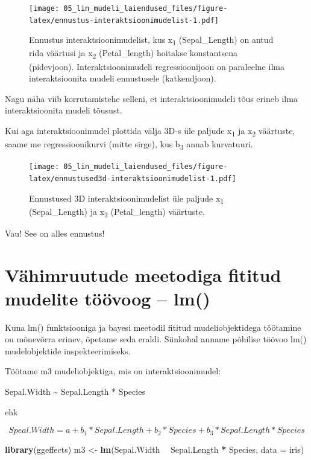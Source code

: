 \documentclass[]{book}
\newenvironment{Shaded}{\begin{snugshade}}{\end{snugshade}}
\newcommand{\KeywordTok}[1]{\textcolor[rgb]{0.13,0.29,0.53}{\textbf{#1}}}
\newcommand{\DataTypeTok}[1]{\textcolor[rgb]{0.13,0.29,0.53}{#1}}
\newcommand{\StringTok}[1]{\textcolor[rgb]{0.31,0.60,0.02}{#1}}
\newcommand{\OperatorTok}[1]{\textcolor[rgb]{0.81,0.36,0.00}{\textbf{#1}}}
\newcommand{\NormalTok}[1]{#1}
\begin{document}
\begin{figure}
\centering
\texttt{[image: 05\_lin\_mudeli\_laiendused\_files/figure-latex/ennustus-interaktsioonimudelist-1.pdf]}
\caption{\label{fig:ennustus-interaktsioonimudelist}Ennustus interaktsioonimudelist,
kus x\textsubscript{1} (Sepal\_Length) on antud rida väärtusi ja
x\textsubscript{2} (Petal\_length) hoitakse konstantsena (pidevjoon).
Interaktsioonimudeli regressioonijoon on paraleelne ilma
interaktsioonita mudeli ennustusele (katkendjoon).}
\end{figure}

Nagu näha viib korrutamistehe selleni, et interaktsioonimudeli tõus
erineb ilma interaktsioonita mudeli tõusust.

Kui aga interaktsioonimudel plottida välja 3D-s üle paljude
x\textsubscript{1} ja x\textsubscript{2} väärtuste, saame me
regressioonikurvi (mitte sirge), kus b\textsubscript{3} annab
kurvatuuri.





\begin{figure}
\centering
\texttt{[image: 05\_lin\_mudeli\_laiendused\_files/figure-latex/ennustused3d-interaktsioonimudelist-1.pdf]}
\caption{\label{fig:ennustused3d-interaktsioonimudelist}Ennustused 3D
interaktsioonimudelist üle paljude x\textsubscript{1} (Sepal\_Length) ja
x\textsubscript{2} (Petal\_length) väärtuste.}
\end{figure}

Vau! See on alles ennustus!

\chapter{Vähimruutude meetodiga fititud mudelite töövoog --
lm()}\label{vahimruutude-meetodiga-fititud-mudelite-toovoog-lm}

Kuna lm() funktsiooniga ja bayesi meetodil fititud mudeliobjektidega
töötamine on mõnevõrra erinev, õpetame seda eraldi. Siinkohal anname
põhilise töövoo lm() mudelobjektide inspekteerimiseks.

Töötame m3 mudeliobjektiga, mis on interaktsioonimudel:

Sepal.Width \textasciitilde{} Sepal.Length * Species

ehk

\[Speal.Width = a + b_1*Sepal.Length + b_2*Species + b_3*Sepal.Length*Species\]

\begin{Shaded}
\begin{Highlighting}[]
\KeywordTok{library}\NormalTok{(ggeffects)}
\NormalTok{m3 <-}\StringTok{ }\KeywordTok{lm}\NormalTok{(Sepal.Width }\OperatorTok{~}\StringTok{ }\NormalTok{Sepal.Length }\OperatorTok{*}\StringTok{ }\NormalTok{Species, }\DataTypeTok{data =}\NormalTok{ iris)}
\end{Highlighting}
\end{Shaded}
\end{document}
